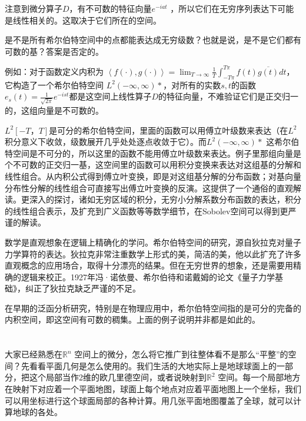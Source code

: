 注意到微分算子$ D $，有不可数的特征向量$ e^{−iat} $ ，所以它们在无穷序列表达下可能是线性相关的。这取决于它们所在的空间。

是不是所有希尔伯特空间中的点都能表达成无穷级数？也就是说，是不是它们都有可数的基？答案是否定的。

\kaishu\setlength{\leftskip}{1em}

例如：对于函数定义内积为 $ \left \langle f(\cdot),g(\cdot) \right \rangle = \lim_{T\rightarrow \infty}\frac{1}{T}\int_{-T\pi}^{T\pi} f(t)\overline{g(t)}dt $，它构造了一个希尔伯特空间 $ L^2(-\infty, \infty)* $，对所有的实数$ s, t $的函数 $ e_s(t) = \frac{1}{\sqrt{2\pi}}e^{-ist} $都是这空间上线性算子$ D $的特征向量，不难验证它们是正交归一的，这组向量是不可数的。

\songti\setlength{\leftskip}{0em}

$ L^2[-T，T] $是可分的希尔伯特空间，里面的函数可以用傅立叶级数来表达（在$ L^2 $积分意义下收敛，级数展开几乎处处逐点收敛于它）。而$ L^2(-\infty, \infty)* $ 这希尔伯特空间是不可分的，所以这里的函数不能用傅立叶级数来表达。例子里那组向量是个不可数的正交归一基，这空间里的函数可以用积分变换来表达对这组基的分解和线性组合。从内积公式得到傅立叶变换，即是对这组基分解的分布函数；对基向量分布性分解的线性组合可直接写出傅立叶变换的反演。这提供了一个通俗的直观解读。更深入的探讨，诸如无穷区域的积分，无穷小分解系数分布函数的表达，积分的线性组合表示，及扩充到广义函数等等数学细节，在Sobolev空间可以得到更严谨的解读。

数学是直观想象在逻辑上精确化的学问。希尔伯特空间的研究，源自狄拉克对量子力学算符的表达。狄拉克非常注重数学上形式的美，简洁的美，他以此扩充了许多直观概念的应用场合，取得十分漂亮的结果。但在无穷世界的想象，还是需要用精确的逻辑来校正。1927年冯·诺依曼、希尔伯待和诺戴姆的论文《量子力学基础》，纠正了狄拉克缺乏严谨的不足。

在早期的泛函分析研究，特别是在物理应用中，希尔伯特空间指的是可分的完备的内积空间，即这空间有可数的稠集。上面的例子说明并非都是如此的。\\
\\
\\

大家已经熟悉在$ \mathbb{R}^n $ 空间上的微分，怎么将它推广到往整体看不是那么``平整''的空间？先看看平面几何是怎么使用的。我们生活的大地实际上是地球球面上的一部分，把这个局部当作2维的欧几里德空间，或者说映射到$ \mathbb{R}^2 $ 空间。每一个局部地方在映射下对应着一个平面地图，球面上每个地点对应着平面地图上一个坐标，我们可以用坐标进行这个球面局部的各种计算。用几张平面地图覆盖了全球，就可以计算地球的各处。

